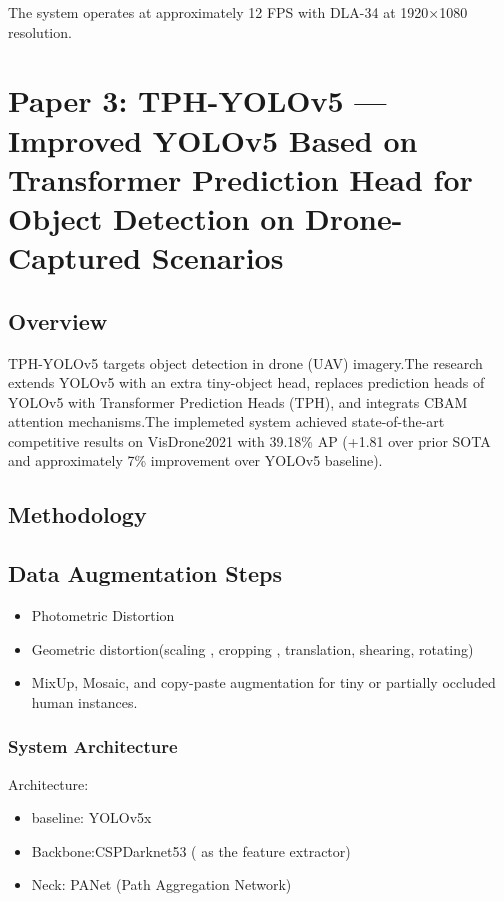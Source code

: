 \documentclass[12pt,a4paper]{report}
\begin{document}
The system operates at approximately 12 FPS with DLA-34 at 1920×1080 resolution.



\section{Paper 3: TPH-YOLOv5 — Improved YOLOv5 Based on Transformer Prediction Head for Object Detection on Drone-Captured Scenarios}

\subsection{Overview}
TPH-YOLOv5 targets object detection in drone (UAV) imagery.The research extends YOLOv5 with an extra tiny-object head, replaces prediction heads of YOLOv5 with Transformer Prediction Heads (TPH), and integrats CBAM attention mechanisms.The implemeted system achieved state-of-the-art competitive results on VisDrone2021 with 39.18\% AP (+1.81 over prior SOTA and approximately 7\% improvement over YOLOv5 baseline).

\subsection{Methodology}

\subsection{Data Augmentation Steps}
\begin{itemize}
    \item Photometric Distortion
    \item Geometric distortion(scaling , cropping , translation, shearing, rotating)
    \item MixUp, Mosaic, and copy-paste augmentation for tiny or partially occluded human instances.
\end{itemize}

\subsubsection{System Architecture}
Architecture: 
  \begin{itemize}
      \item baseline: YOLOv5x
      \item Backbone:CSPDarknet53 ( as the feature extractor) 
      \item Neck: PANet (Path Aggregation Network) 
  \end{itemize}
\end{document}
